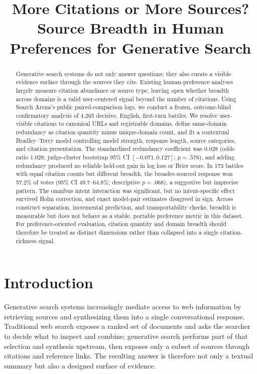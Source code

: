 \documentclass[sigconf,natbib=true,anonymous=true]{acmart}
\title{More Citations or More Sources? Source Breadth in Human Preferences for Generative Search}
\begin{document}
\begin{abstract}
Generative search systems do not only answer questions; they also curate a visible evidence surface through the sources they cite. Existing human-preference analyses largely measure citation abundance or source type, leaving open whether breadth across domains is a valid user-centered signal beyond the number of citations. Using Search Arena's public paired-comparison logs, we conduct a frozen, outcome-blind confirmatory analysis of 4,265 decisive, English, first-turn battles. We resolve user-visible citations to canonical URLs and registrable domains, define same-domain redundancy as citation quantity minus unique-domain count, and fit a contextual Bradley--Terry model controlling model strength, response length, source categories, and citation presentation. The standardized redundancy coefficient was 0.028 (odds ratio 1.028; judge-cluster bootstrap 95\% CI $[-0.071,0.127]$; $p=.576$), and adding redundancy produced no reliable held-out gain in log loss or Brier score. In 173 battles with equal citation counts but different breadth, the broader-sourced response won 57.2\% of votes (95\% CI 49.7--64.8\%; descriptive $p=.068$), a suggestive but imprecise pattern. The omnibus intent interaction was significant, but no intent-specific effect survived Holm correction, and exact model-pair estimates disagreed in sign. Across construct separation, incremental prediction, and transportability checks, breadth is measurable but does not behave as a stable, portable preference metric in this dataset. For preference-oriented evaluation, citation quantity and domain breadth should therefore be treated as distinct dimensions rather than collapsed into a single citation-richness signal.
\end{abstract}


\maketitle

\section{Introduction}
Generative search systems increasingly mediate access to web information by retrieving sources and synthesizing them into a single conversational response. Traditional web search exposes a ranked set of documents and asks the searcher to decide what to inspect and combine; generative search performs part of that selection and synthesis upstream, then exposes only a subset of sources through citations and reference links. The resulting answer is therefore not only a textual summary but also a designed surface of evidence.
\end{document}

